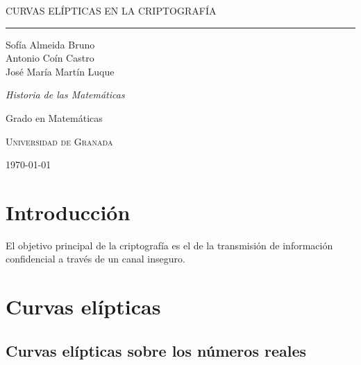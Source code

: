 \documentclass[
  a4paper,
  12pt,
  spanish,
]{scrartcl}
\DeclareRobustCommand{\spacedallcaps}[1]{{\linespread{1.3}\sacshape\MakeTextUppercase{#1}}}%
\newcommand{\horrule}[1]{\rule{\linewidth}{#1}}
\begin{document}
\begin{titlepage}
  \vspace*{4cm}

  \begin{flushleft}
    \Huge
    \spacedallcaps{Curvas Elípticas en la Criptografía}
    \horrule{2pt}
  \end{flushleft}

  \vspace{2em}

  \begin{flushright}
    \large
    Sofía Almeida Bruno\\
    Antonio Coín Castro\\
    José María Martín Luque\vspace{1em}
  
    \textit{Historia de las Matemáticas}
  
    Grado en Matemáticas
  
    \textsc{Universidad de Granada}\vspace{1em}
  
    \today\vspace{.5em}
  \end{flushright}
\end{titlepage}

\newpage

{\hypersetup{hidelinks}
\tableofcontents
}

\newpage

\section{Introducción}

El objetivo principal de la criptografía es el de la transmisión de información confidencial a través de un canal inseguro.

\section{Curvas elípticas}

\subsection{Curvas elípticas sobre los números reales}




\end{document}
